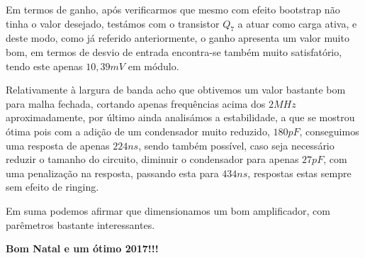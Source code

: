 \documentclass[a4paper]{article}
\begin{document}
    Em termos de ganho, após verificarmos que mesmo com efeito bootstrap não tinha o valor desejado, testámos com o transistor $Q_7$ a atuar como carga ativa, e deste modo, como já referido anteriormente, o ganho apresenta um valor muito bom, em termos de desvio de entrada encontra-se também muito satisfatório, tendo este apenas $10,39mV$ em módulo.
    
    Relativamente à largura de banda acho que obtivemos um valor bastante bom para malha fechada, cortando apenas frequências acima dos $2MHz$ aproximadamente, por último ainda analisámos a estabilidade, a que se mostrou ótima pois com a adição de um condensador muito reduzido, $180pF$, conseguimos uma resposta de apenas $224ns$, sendo também possível, caso seja necessário reduzir o tamanho do circuito, diminuir o condensador para apenas $27pF$, com uma penalização na resposta, passando esta para $434ns$, respostas estas sempre sem efeito de ringing.
    
    Em suma podemos afirmar que dimensionamos um bom amplificador, com parêmetros bastante interessantes.\\
    \vfill
    
    \large{\textbf{Bom Natal e um ótimo 2017!!!}}
%
%

\end{document}
